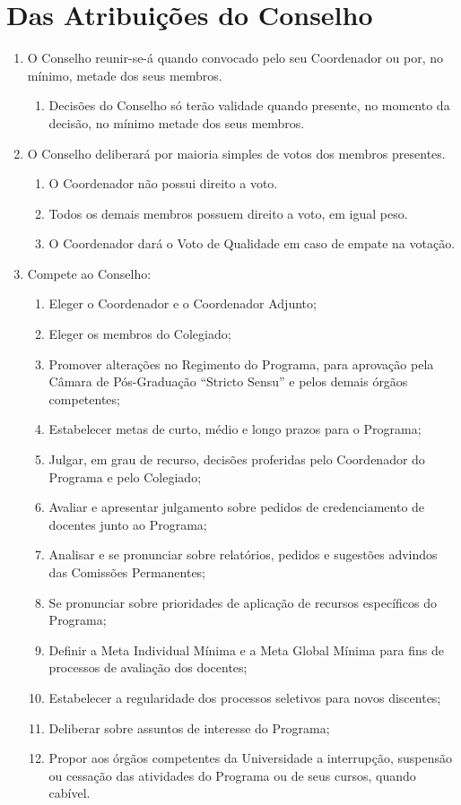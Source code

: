 \documentclass{article}
\newcommand{\singleitem}{\item[Parágrafo Único.]}
\newcommand{\grupoMenor}{Colegiado\xspace}
\newcommand{\grupoMaior}{Conselho\xspace}
\begin{document}
\section{Das Atribuições do \grupoMaior}
\begin{enumerate}

	\item O \grupoMaior reunir-se-á quando convocado pelo seu Coordenador ou por, no mínimo, metade dos seus membros.
	\begin{enumerate}
		\singleitem Decisões do \grupoMaior só terão validade quando presente, no momento da decisão, no mínimo metade dos seus membros.
	\end{enumerate}

	\item O \grupoMaior deliberará por maioria simples de votos dos membros presentes.
	\begin{enumerate}
		\item O Coordenador não possui direito a voto.
		\item Todos os demais membros possuem direito a voto, em igual peso.
		\item O Coordenador dará o Voto de Qualidade em caso de empate na votação. 
	\end{enumerate}

	\item Compete ao \grupoMaior:
	\begin{enumerate}[label=\Roman*]
		\item Eleger o Coordenador e o Coordenador Adjunto;
		\item Eleger os membros do \grupoMenor;
		\item Promover alterações no Regimento do Programa, para aprovação pela Câmara de Pós-Graduação ``Stricto Sensu'' e pelos demais órgãos competentes;
		\item Estabelecer metas de curto, médio e longo prazos para o Programa;
		\item Julgar, em grau de recurso, decisões proferidas pelo Coordenador do Programa e pelo \grupoMenor;
		\item Avaliar e apresentar julgamento sobre pedidos de credenciamento de docentes junto ao Programa;
		\item Analisar e se pronunciar sobre relatórios, pedidos e sugestões advindos das Comissões Permanentes;
		\item Se pronunciar sobre prioridades de aplicação de recursos específicos do Programa;
		\item Definir a Meta Individual Mínima e a Meta Global Mínima para fins de processos de avaliação dos docentes;
		\item Estabelecer a regularidade dos processos seletivos para novos discentes;
		\item Deliberar sobre assuntos de interesse do Programa;		
		\item Propor aos órgãos competentes da Universidade a interrupção, suspensão ou cessação das atividades do Programa ou de seus cursos, quando cabível.
	\end{enumerate}


\end{enumerate}
\end{document}
